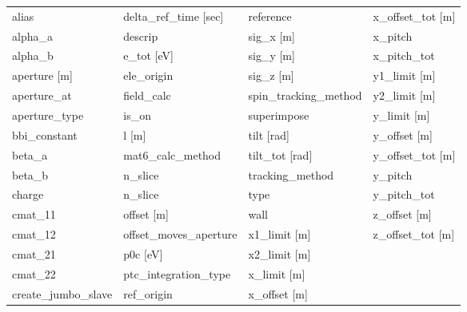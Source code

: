  \begin{tabular}{llll} \toprule
alias                          & delta_ref_time [sec]           & reference                      & x_offset_tot [m]               \\
alpha_a                        & descrip                        & sig_x [m]                      & x_pitch                        \\
alpha_b                        & e_tot [eV]                     & sig_y [m]                      & x_pitch_tot                    \\
aperture [m]                   & ele_origin                     & sig_z [m]                      & y1_limit [m]                   \\
aperture_at                    & field_calc                     & spin_tracking_method           & y2_limit [m]                   \\
aperture_type                  & is_on                          & superimpose                    & y_limit [m]                    \\
bbi_constant                   & l [m]                          & tilt [rad]                     & y_offset [m]                   \\
beta_a                         & mat6_calc_method               & tilt_tot [rad]                 & y_offset_tot [m]               \\
beta_b                         & n_slice                        & tracking_method                & y_pitch                        \\
charge                         & n_slice                        & type                           & y_pitch_tot                    \\
cmat_11                        & offset [m]                     & wall                           & z_offset [m]                   \\
cmat_12                        & offset_moves_aperture          & x1_limit [m]                   & z_offset_tot [m]               \\
cmat_21                        & p0c [eV]                       & x2_limit [m]                   &                                \\
cmat_22                        & ptc_integration_type           & x_limit [m]                    &                                \\
create_jumbo_slave             & ref_origin                     & x_offset [m]                   &                                \\
 \bottomrule
 \end{tabular}
 \vfill

